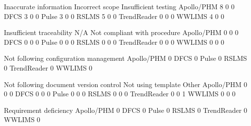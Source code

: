 \documentclass{article}
\begin{document}
\begin{Schunk}
\begin{Soutput}
              Inaccurate information Incorrect scope Insufficient testing
  Apollo/PHM                       8               0                    0
  DFCS                             3               0                    0
  Pulse                            3               0                    0
  RSLMS                            5               0                    0
  TrendReader                      0               0                    0
  WWLIMS                           4               0                    0
             
              Insufficient traceability N/A Not compliant with procedure
  Apollo/PHM                          0   0                            0
  DFCS                                0   0                            0
  Pulse                               0   0                            0
  RSLMS                               0   0                            0
  TrendReader                         0   0                            0
  WWLIMS                              0   0                            0
             
              Not following configuration management
  Apollo/PHM                                       0
  DFCS                                             0
  Pulse                                            0
  RSLMS                                            0
  TrendReader                                      0
  WWLIMS                                           0
             
              Not following document version control Not using template Other
  Apollo/PHM                                       0                  0     0
  DFCS                                             0                  0     0
  Pulse                                            0                  0     0
  RSLMS                                            0                  0     0
  TrendReader                                      0                  0     1
  WWLIMS                                           0                  0     0
             
              Requirement deficiency
  Apollo/PHM                       0
  DFCS                             0
  Pulse                            0
  RSLMS                            0
  TrendReader                      0
  WWLIMS                           0
\end{Soutput}
\end{Schunk}
\end{document}
